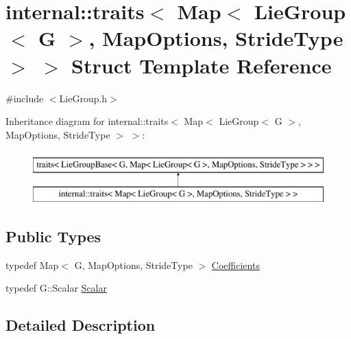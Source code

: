 \hypertarget{structinternal_1_1traits_3_01_map_3_01_lie_group_3_01_g_01_4_00_01_map_options_00_01_stride_type_01_4_01_4}{}\section{internal\+:\+:traits$<$ Map$<$ Lie\+Group$<$ G $>$, Map\+Options, Stride\+Type $>$ $>$ Struct Template Reference}
\label{structinternal_1_1traits_3_01_map_3_01_lie_group_3_01_g_01_4_00_01_map_options_00_01_stride_type_01_4_01_4}


{\ttfamily \#include $<$Lie\+Group.\+h$>$}

Inheritance diagram for internal\+:\+:traits$<$ Map$<$ Lie\+Group$<$ G $>$, Map\+Options, Stride\+Type $>$ $>$\+:\begin{figure}[H]
\begin{center}
\leavevmode
\includegraphics[height=2.000000cm]{structinternal_1_1traits_3_01_map_3_01_lie_group_3_01_g_01_4_00_01_map_options_00_01_stride_type_01_4_01_4}
\end{center}
\end{figure}
\subsection*{Public Types}
\begin{DoxyCompactItemize}
\item 
typedef Map$<$ G, Map\+Options, Stride\+Type $>$ \hyperlink{structinternal_1_1traits_3_01_map_3_01_lie_group_3_01_g_01_4_00_01_map_options_00_01_stride_type_01_4_01_4_ae1223cb79de3b5f754afbacf6b0b956f}{Coefficients}
\item 
typedef G\+::\+Scalar \hyperlink{structinternal_1_1traits_3_01_map_3_01_lie_group_3_01_g_01_4_00_01_map_options_00_01_stride_type_01_4_01_4_ac813c011f308189694ce54531fa28da5}{Scalar}
\end{DoxyCompactItemize}


\subsection{Detailed Description}

